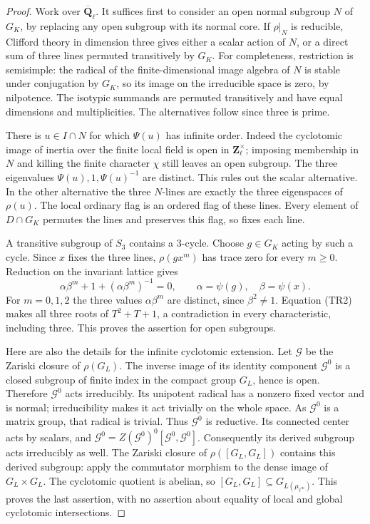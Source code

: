 \begin{proof}
Work over $\overline{\mathbf Q}_\ell$.  It suffices first to consider
an open normal subgroup $N$ of $G_K$, by replacing any open subgroup
with its normal core.  If $\rho|_N$ is reducible, Clifford theory in
dimension three gives either a scalar action of $N$, or a direct sum
of three lines permuted transitively by $G_K$.  For completeness,
restriction is semisimple: the radical of the finite-dimensional image
algebra of $N$ is stable under conjugation by $G_K$, so its image on
the irreducible space is zero, by nilpotence.  The isotypic summands
are permuted transitively and have equal dimensions and multiplicities.
The alternatives follow since three is prime.

There is $u\in I\cap N$ for which $\Psi(u)$ has infinite order.
Indeed the cyclotomic image of inertia over the finite local field is
open in $\mathbf Z_\ell^\times$; imposing membership in $N$ and
killing the finite character $\chi$ still leaves an open subgroup.
The three eigenvalues $\Psi(u),1,\Psi(u)^{-1}$ are distinct.
This rules out the scalar alternative.  In the other alternative
the three $N$-lines are exactly the three eigenspaces of $\rho(u)$.
The local ordinary flag is an ordered flag of these lines.  Every
element of $D\cap G_K$ permutes the lines and preserves this flag,
so fixes each line.

A transitive subgroup of $S_3$ contains a $3$-cycle.  Choose $g\in G_K$
acting by such a cycle.  Since $x$ fixes the three lines,
$\rho(gx^m)$ has trace zero for every $m\ge0$.  Reduction on the
invariant lattice gives
\[
  \alpha\beta^m+1+(\alpha\beta^m)^{-1}=0,
  \qquad \alpha=\psi(g),\quad\beta=\psi(x).            \tag{TR2}
\]
For $m=0,1,2$ the three values $\alpha\beta^m$ are distinct, since
$\beta^2\ne1$.  Equation (TR2) makes all three roots of
$T^2+T+1$, a contradiction in every characteristic, including three.
This proves the assertion for open subgroups.

Here are also the details for the infinite cyclotomic extension.
Let $\mathcal G$ be the Zariski closure of $\rho(G_L)$.
The inverse image of its identity component $\mathcal G^0$ is a
closed subgroup of finite index in the compact group $G_L$, hence is
open.  Therefore $\mathcal G^0$ acts irreducibly.  Its unipotent
radical has a nonzero fixed vector and is normal; irreducibility makes
it act trivially on the whole space.  As $\mathcal G^0$ is a matrix
group, that radical is trivial.  Thus $\mathcal G^0$ is reductive.
Its connected center acts by scalars, and
$\mathcal G^0=Z(\mathcal G^0)^0[\mathcal G^0,\mathcal G^0]$.
Consequently its derived subgroup acts irreducibly as well.
The Zariski closure of $\rho([G_L,G_L])$ contains this derived
subgroup: apply the commutator morphism to the dense image of
$G_L\times G_L$.  The cyclotomic quotient is abelian, so
$[G_L,G_L]\subseteq G_{L(\mu_{\ell^\infty})}$.  This proves the
last assertion, with no assertion about equality of local and global
cyclotomic intersections.
\end{proof}


